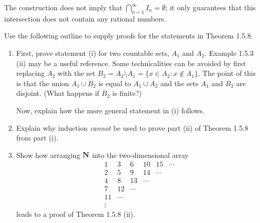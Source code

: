 \documentclass{lew98_solutions}
\begin{document}
\begin{solution}
    The construction does not imply that \( \bigcap_{n=1}^{\infty} I_n = \emptyset \); it only guarantees that this intersection does not contain any rational numbers.
\end{solution}

\begin{exercise}
\label{ex:1.5.3}
    Use the following outline to supply proofs for the statements in Theorem 1.5.8.
    \begin{enumerate}
        \item First, prove statement (i) for two countable sets, \( A_1 \) and \( A_2 \). Example 1.5.3 (ii) may be a useful reference. Some technicalities can be avoided by first replacing \( A_2 \) with the set \( B_2 = A_2 \setminus A_1 = \{ x \in A_2 : x \not\in A_1 \} \). The point of this is that the union \( A_1 \cup B_2 \) is equal to \( A_1 \cup A_2 \) and the sets \( A_1 \) and \( B_2 \) are disjoint. (What happens if \( B_2 \) is finite?)

        Now, explain how the more general statement in (i) follows.

        \item Explain why induction \textit{cannot} be used to prove part (ii) of Theorem 1.5.8 from part (i).

        \item Show how arranging \( \mathbf{N} \) into the two-dimensional array
        \[
            \begin{matrix}
            1 & 3 & 6 & 10 & 15 & \cdots \\
            2 & 5 & 9 & 14 & \cdots &  \\
            4 & 8 & 13 & \cdots &  &  \\
            7 & 12 & \cdots &   &  &  \\
            11 & \cdots &  &  &  &  \\
            \vdots &  &  &  &  & 
            \end{matrix}
        \]
        leads to a proof of Theorem 1.5.8 (ii).
    \end{enumerate}
\end{exercise}
\end{document}
